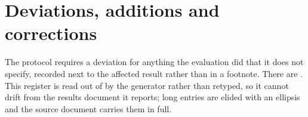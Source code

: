 \section{Deviations, additions and corrections}
\label{app:deviations}

The protocol requires a deviation for anything the evaluation did that it does not specify, recorded
next to the affected result rather than in a footnote. There are \vsevenDeviations{}. This register is
read out of  by the generator rather than retyped, so it cannot
drift from the results document it reports; long entries are elided with an ellipsis and the source
document carries them in full.

{\tabfont}

